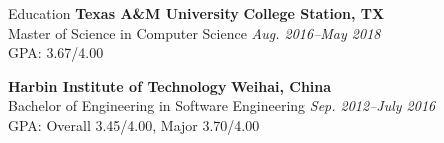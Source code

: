 \documentclass{resume} %
\begin{document}

\begin{rSection}{Education}
{\bf Texas A\&M University} \hfill {\bf College Station, TX} 
\\ Master of Science in Computer Science \hfill {\em Aug. 2016--May 2018}
\\ GPA: 3.67/4.00
\vspace*{-0.2em}

{\bf Harbin Institute of Technology} \hfill {\bf Weihai, China} 
\\ Bachelor of Engineering in Software Engineering \hfill {\em Sep. 2012--July 2016}
\\ GPA: Overall 3.45/4.00, Major 3.70/4.00



\end{rSection}



\end{document}
